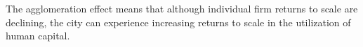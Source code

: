 The \gls{agglomeration effect} means that although individual firm returns to scale are declining, the city can experience \gls{increasing returns to scale} in the utilization of human capital. %
